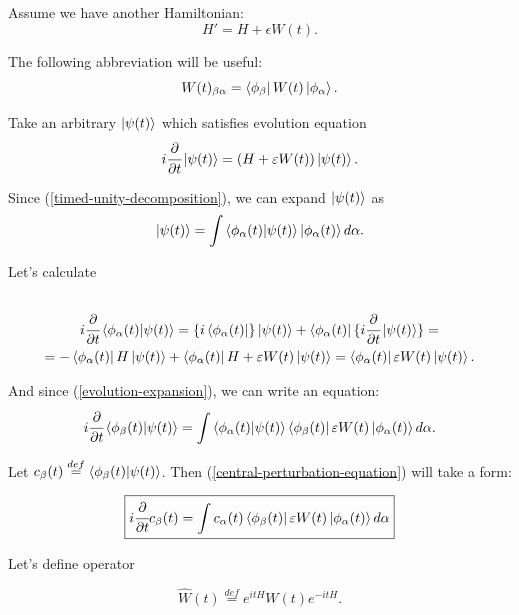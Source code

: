 \documentclass[main.tex]{subfiles}
\begin{document}
Assume we have another Hamiltonian:
\begin{equation}
H' = H + \epsilon W(t).
\end{equation} 

The following abbreviation will be useful:
$$W(t)_{\beta \alpha} = \bra{\phi_\beta} W(t) \ket{\phi_\alpha}.$$

Take an arbitrary $\ket{\psi(t)}$ which satisfies evolution equation
\begin{equation}
i\cfrac{\partial}{\partial t}\ket{\psi(t)} = (H + \varepsilon W(t)) \ket{\psi(t)}.
\end{equation}

Since (\ref{timed-unity-decomposition}), we can expand $\ket{\psi(t)}$ as 
\begin{equation}
\label{evolution-expansion}
\ket{\psi(t)} = \int \bra{\phi_\alpha(t)}\ket{\psi(t)}\ket{\phi_\alpha(t)}d\alpha.
\end{equation}

Let's calculate
\begin{multline*}\\
i\cfrac{\partial}{\partial t} \bra{\phi_\alpha(t)}\ket{\psi(t)} = \{i \bra{\phi_\alpha(t)}\} \ket{\psi(t)} + \bra{\phi_\alpha(t)}\{i \cfrac{\partial}{\partial t} \ket{\psi(t)}\} = 
\\
= - \bra{\phi_\alpha(t)} H \ket{\psi(t)} + \bra{\phi_\alpha(t)} H + \varepsilon W(t)\ket{\psi(t)}= \bra{\phi_\alpha(t)} \varepsilon W(t) \ket{\psi(t)}.\\
\end{multline*}

And since (\ref{evolution-expansion}), we can write an equation:
\begin{equation}
\label{central-perturbation-equation}
i\cfrac{\partial}{\partial t} \bra{\phi_\beta(t)}\ket{\psi(t)} = \int \bra{\phi_\alpha(t)}\ket{\psi(t)}\bra{\phi_\beta(t)}\varepsilon W(t) \ket{\phi_\alpha(t)}d\alpha.
\end{equation}

Let $c_\beta(t) \stackrel{def}{=}  \bra{\phi_\beta(t)}\ket{\psi(t)}$. Then (\ref{central-perturbation-equation}) will take a form:

\begin{equation}
\boxed{
i\cfrac{\partial}{\partial t} c_\beta(t) = \int c_\alpha(t)\bra{\phi_\beta(t)} \varepsilon W(t) \ket{\phi_\alpha(t)}d\alpha
}
\end{equation}

Let's define operator

 
\begin{equation}
\hat{W}(t)\stackrel{def}{=} e^{itH} W(t) e^{-itH}.
\end{equation}
\end{document}
